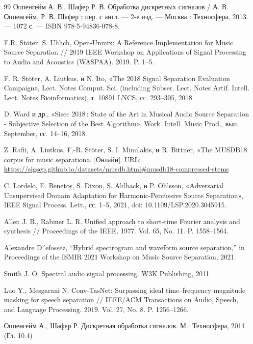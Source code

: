 \documentclass[14pt]{extarticle}
\begin{document}
\begin{thebibliography}{99}
	Оппенгейм А. В., Шафер Р. В. Обработка дискретных сигналов / А. В. Оппенгейм, Р. В. Шафер ; пер. с англ. — 2-е изд. — Москва : Техносфера, 2013. — 1072 с. — ISBN 978-5-94836-078-8.

	F.R. Stöter, S. Uhlich, Open-Unmix: A Reference Implementation for Music Source Separation // 2019 IEEE Workshop on Applications of Signal Processing to Audio and Acoustics (WASPAA). 2019. P. 1–5.

	F. R. Stöter, A. Liutkus, и N. Ito, «The 2018 Signal Separation Evaluation Campaign», Lect. Notes Comput. Sci. (including Subser. Lect. Notes Artif. Intell. Lect. Notes Bioinformatics), т. 10891 LNCS, сс. 293–305, 2018

	D. Ward и др., «Sisec 2018 : State of the Art in Musical Audio Source Separation - Subjective Selection of the Best Algorithm», Work. Intell. Music Prod., вып. September, сс. 14–16, 2018.

	Z. Rafii, A. Liutkus, F.-R. Stöter, S. I. Mimilakis, и R. Bittner, «The MUSDB18 corpus for music separation». [Онлайн]. URL: \href{https://sigsep.github.io/datasets/musdb.html}{https://sigsep.github.io/datasets/musdb.html\#musdb18-compressed-stems}

	C. Lordelo, E. Benetos, S. Dixon, S. Ahlback, и P. Ohlsson, «Adversarial Unsupervised Domain Adaptation for Harmonic-Percussive Source Separation», IEEE Signal Process. Lett., сс. 1–5, 2021, doi: 10.1109/LSP.2020.3045915.

	Allen J. B., Rabiner L. R. Unified approach to short-time Fourier analysis and synthesis // Proceedings of the IEEE. 1977. Vol. 65, No. 11. P. 1558–1564.

	Alexandre D´efossez, “Hybrid spectrogram and waveform source separation,” in Proceedings of the ISMIR 2021 Workshop on Music Source Separation, 2021.

	Smith J. O. Spectral audio signal processing. W3K Publishing, 2011

	Luo Y., Mesgarani N. Conv-TasNet: Surpassing ideal time–frequency magnitude masking for speech separation // IEEE/ACM Transactions on Audio, Speech, and Language Processing. 2019. Vol. 27, No. 8. P. 1256–1266.

	Оппенгейм А., Шафер Р. Дискретная обработка сигналов. М.: Техносфера, 2011. (Гл. 10.4)
	

\end{thebibliography}
\end{document}
